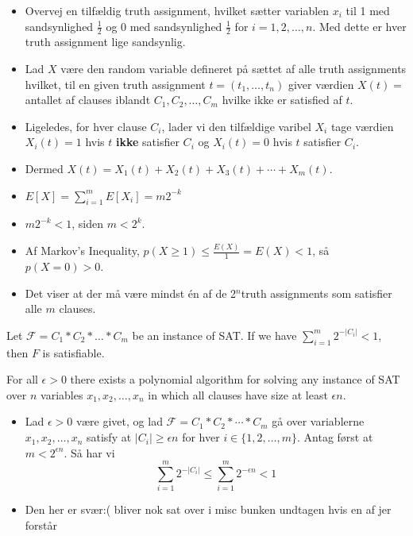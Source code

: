 \documentclass{beamer}
\begin{document}
\begin{frame}[allowframebreaks]
  \begin{itemize}
  \item Overvej en tilfældig truth assignment, hvilket sætter variablen $x_{i}$ til 1 med sandsynlighed $\frac{1}{2}$ og $0$ med sandsynlighed $\frac{1}{2}$ for $i = 1, 2, \ldots, n$. Med dette er hver truth assignment lige sandsynlig.
  \item Lad $X$ være den random variable defineret på sættet af alle truth assignments hvilket, til en given truth assignment $t = (t_{1}, \ldots, t_{n})$ giver værdien $X(t) = $ antallet af clauses iblandt $C_{1},C_{2}, \ldots, C_{m}$ hvilke ikke er satisfied af $t$. 
  \item Ligeledes, for hver clause $C_{i}$, lader vi den tilfældige varibel $X_{i}$ tage værdien $X_i(t) = 1$ hvis $t$ \textbf{ikke} satisfier $C_{i}$ og $X_{i}(t) = 0$ hvis $t$ satisfier $C_{i}$. 
  \item Dermed $X(t) = X_{1}(t) + X_{2}(t) + X_{3}(t) + \cdots + X_{m}(t)$. 
  \item $E[X] = \sum_{i=1}^{m} E[X_{i}] = m2^{-k}$
  \item $m2^{-k} < 1$, siden $m < 2^{k}$.
  \item Af Markov's Inequality, $p(X \geq 1) \leq \frac{E(X)}{1} = E(X) < 1$, så $p(X= 0) > 0$. 
  \item Det viser at der må være mindst én af de 2$^{n}$truth assignments som satisfier alle $m$ clauses.
  \end{itemize}

  \begin{theorem}[B]
    Let $\mathcal{F} = C_{1} * C_{2} * \ldots * C_{m}$ be an instance of SAT. If we have $\sum_{i=1}^{m} 2^{-|C_{i}|} < 1$, then $F$ is satisfiable.
  \end{theorem}

  \begin{corollary}
For all $\epsilon > 0$ there exists a polynomial algorithm for solving any instance of SAT over $n$ variables $x_{1}, x_{2}, \ldots, x_{n}$ in which all clauses have size at least $\epsilon n$.
  \end{corollary}

  \begin{itemize}
  \item Lad $\epsilon > 0$ være givet, og lad $\mathcal{F} = C_{1} * C_{2} * \cdots * C_{m}$ gå over variablerne $x_{1}, x_{2}, \ldots, x_{n}$ satisfy at $|C_{i}| \geq \epsilon n$ for hver $i \in \{1,2, \ldots, m\}$. Antag først at $m < 2^{\epsilon n}$. Så har vi
    \[ \sum_{i=1}^{m} 2^{-|C_{i}|}\leq \sum_{i=1}^{m} 2^{- \epsilon n} < 1\]
    \item Den her er svær:( bliver nok sat over i misc bunken undtagen hvis en af jer forstår 
  \end{itemize}
\end{frame}
\end{document}
